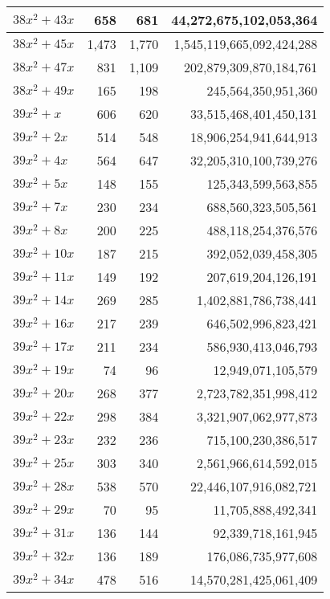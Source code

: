 \documentclass[a4paper]{amsproc}
\theoremstyle{plain}
\begin{document}
\begin{longtable}{ | l | r | r | r | }
$38x^2 + 43x$ & 658 & 681 & 44{,}272{,}675{,}102{,}053{,}364 \\ \hline
$38x^2 + 45x$ & 1{,}473 & 1{,}770 & 1{,}545{,}119{,}665{,}092{,}424{,}288 \\ \hline
$38x^2 + 47x$ & 831 & 1{,}109 & 202{,}879{,}309{,}870{,}184{,}761 \\ \hline
$38x^2 + 49x$ & 165 & 198 & 245{,}564{,}350{,}951{,}360 \\ \hline
$39x^2 + x$ & 606 & 620 & 33{,}515{,}468{,}401{,}450{,}131 \\ \hline
$39x^2 + 2x$ & 514 & 548 & 18{,}906{,}254{,}941{,}644{,}913 \\ \hline
$39x^2 + 4x$ & 564 & 647 & 32{,}205{,}310{,}100{,}739{,}276 \\ \hline
$39x^2 + 5x$ & 148 & 155 & 125{,}343{,}599{,}563{,}855 \\ \hline
$39x^2 + 7x$ & 230 & 234 & 688{,}560{,}323{,}505{,}561 \\ \hline
$39x^2 + 8x$ & 200 & 225 & 488{,}118{,}254{,}376{,}576 \\ \hline
$39x^2 + 10x$ & 187 & 215 & 392{,}052{,}039{,}458{,}305 \\ \hline
$39x^2 + 11x$ & 149 & 192 & 207{,}619{,}204{,}126{,}191 \\ \hline
$39x^2 + 14x$ & 269 & 285 & 1{,}402{,}881{,}786{,}738{,}441 \\ \hline
$39x^2 + 16x$ & 217 & 239 & 646{,}502{,}996{,}823{,}421 \\ \hline
$39x^2 + 17x$ & 211 & 234 & 586{,}930{,}413{,}046{,}793 \\ \hline
$39x^2 + 19x$ & 74 & 96 & 12{,}949{,}071{,}105{,}579 \\ \hline
$39x^2 + 20x$ & 268 & 377 & 2{,}723{,}782{,}351{,}998{,}412 \\ \hline
$39x^2 + 22x$ & 298 & 384 & 3{,}321{,}907{,}062{,}977{,}873 \\ \hline
$39x^2 + 23x$ & 232 & 236 & 715{,}100{,}230{,}386{,}517 \\ \hline
$39x^2 + 25x$ & 303 & 340 & 2{,}561{,}966{,}614{,}592{,}015 \\ \hline
$39x^2 + 28x$ & 538 & 570 & 22{,}446{,}107{,}916{,}082{,}721 \\ \hline
$39x^2 + 29x$ & 70 & 95 & 11{,}705{,}888{,}492{,}341 \\ \hline
$39x^2 + 31x$ & 136 & 144 & 92{,}339{,}718{,}161{,}945 \\ \hline
$39x^2 + 32x$ & 136 & 189 & 176{,}086{,}735{,}977{,}608 \\ \hline
$39x^2 + 34x$ & 478 & 516 & 14{,}570{,}281{,}425{,}061{,}409 \\ \hline

\end{longtable}
\end{document}
